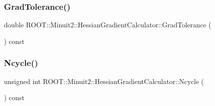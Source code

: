 \subsubsection{\texorpdfstring{GradTolerance()}{GradTolerance()}\hspace{0.1cm}{\footnotesize\ttfamily [2/2]}}
{\footnotesize\ttfamily double R\+O\+O\+T\+::\+Minuit2\+::\+Hessian\+Gradient\+Calculator\+::\+Grad\+Tolerance (\begin{DoxyParamCaption}{ }\end{DoxyParamCaption}) const}

\mbox{\label{classROOT_1_1Minuit2_1_1HessianGradientCalculator_a234641f72296f007b2d95b514be07138}} 
\subsubsection{\texorpdfstring{Ncycle()}{Ncycle()}\hspace{0.1cm}{\footnotesize\ttfamily [1/2]}}
{\footnotesize\ttfamily unsigned int R\+O\+O\+T\+::\+Minuit2\+::\+Hessian\+Gradient\+Calculator\+::\+Ncycle (\begin{DoxyParamCaption}{ }\end{DoxyParamCaption}) const}

